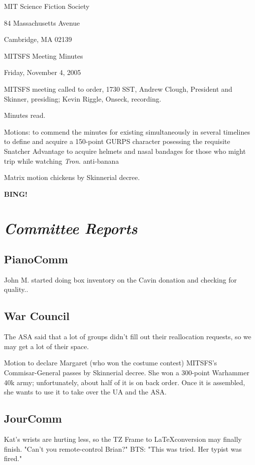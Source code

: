 \documentclass[10pt]{article}
\newcommand{\bing}{{\bf BING!} }
\newcommand{\goto}[1]{\bing \vskip 12pt \section*{{\em{#1}}}}
\begin{document}
\begin{center}

MIT Science Fiction Society

84 Massachusetts Avenue

Cambridge, MA 02139

\vspace{12pt}

MITSFS Meeting Minutes

Friday, November 4, 2005

\end{center}

\vspace{18pt}

\setlength{\parskip}{6pt}

\noindent
MITSFS meeting called to order, 1730 SST, Andrew Clough, President and 
Skinner, presiding; Kevin Riggle,  Onseck, recording.

Minutes read.

Motions: to commend the minutes for existing simultaneously in several timelines
to define and acquire a 150-point GURPS character posessing the requisite Snatcher Advantage
to acquire helmets and nasal bandages for those who might trip while watching {\em Tron}.
anti-banana

Matrix motion chickens by Skinnerial decree.

\goto{Committee Reports}
\subsection*{PianoComm}
John M. started doing box inventory on the Cavin donation and checking for quality..

\subsection*{War Council}
The ASA said that a lot of groups didn't fill out their reallocation requests, so we may get a lot
of their space.

Motion to declare Margaret (who won the costume contest) MITSFS's Commisar-General passes by 
Skinnerial decree.  She won a 300-point Warhammer 40k army; unfortunately, about half of it is
on back order.  Once it is assembled, she wants to use it to take over the UA and the ASA.

\subsection*{JourComm}
Kat's wrists are hurting less, so the TZ Frame to \LaTeX conversion may finally finish.
"Can't you remote-control Brian?"  
BTS: "This was tried.  Her typist was fired."
\end{document}
